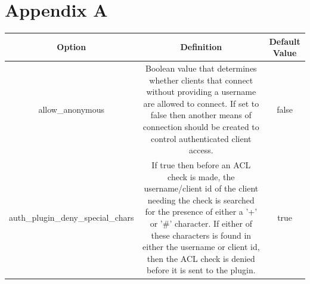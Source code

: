 \documentclass[12pt]{article}
\begin{document}
\section*{Appendix A}
\begin{tabulary}{\textwidth}{cCc}
\hline
Option & Definition & Default Value\\
\hline
allow\_anonymous & Boolean value that determines whether clients that connect without providing a username are allowed to connect. If set to false then another means of connection should be created to control authenticated client access. & false\\
auth\_plugin\_deny\_special\_chars & If true then before an ACL check is made, the username/client id of the client needing the check is searched for the presence of either a '+' or '\#' character. If either of these characters is found in either the username or client id, then the ACL check is denied before it is sent to the plugin. & true\\

\end{tabulary}


\end{document}
